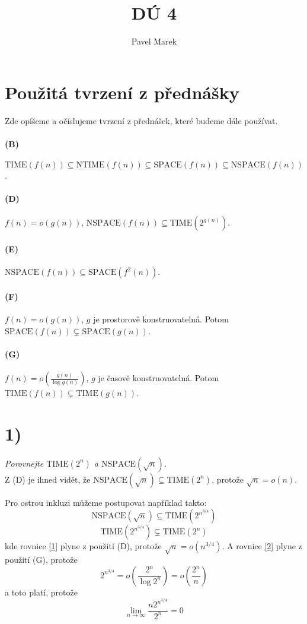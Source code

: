 \documentclass{article}
\author{Pavel Marek}
\title{DÚ 4}
\date{}
\newcommand{\TIME}[1]{\mathrm{TIME}(#1)}
\newcommand{\NTIME}[1]{\mathrm{NTIME}(#1)}
\newcommand{\SPACE}[1]{\mathrm{SPACE}(#1)}
\newcommand{\NSPACE}[1]{\mathrm{NSPACE}(#1)}
\begin{document}
\maketitle

\section*{Použitá tvrzení z přednášky}
Zde opíšeme a očíslujeme tvrzení z přednášek, které budeme dále používat.

\paragraph{(B)}
$\TIME{f(n)} \subseteq \NTIME{f(n)} \subseteq \SPACE{f(n)} \subseteq
\NSPACE{f(n)}$.

\paragraph{(D)}
$f(n) = o(g(n))$, $\NSPACE{f(n)} \subseteq \TIME{2^{g(n)}}$.

\paragraph{(E)}
$\NSPACE{f(n)} \subseteq \SPACE{f^2(n)}$.

\paragraph{(F)}
$f(n) = o(g(n))$, $g$ je prostorově konstruovatelná.
Potom $\SPACE{f(n)} \subsetneq \SPACE{g(n)}$.

\paragraph{(G)}
$f(n) = o(\frac{g(n)}{\log g(n)})$, $g$ je časově konstruovatelná.
Potom $\TIME{f(n)} \subsetneq \TIME{g(n)}$.


\section*{1)} 
\emph{Porovnejte $\TIME{2^n}$ a $\NSPACE{\sqrt{n}}$.}\\

Z (D) je ihned vidět, že $\NSPACE{\sqrt{n}} \subseteq \TIME{2^n}$,
protože $\sqrt{n} = o(n)$.

Pro ostrou inkluzi můžeme postupovat například takto: 
\begin{equation} \label{1}
  \NSPACE{\sqrt{n}} \subseteq \TIME{2^{n^{3/4}}}
\end{equation}
\begin{equation} \label{2}
  \TIME{2^{n^{3/4}}} \subsetneq \TIME{2^n}
\end{equation}
kde rovnice \ref{1} plyne z použití (D), protože $\sqrt{n} = o(n^{3/4})$.
A rovnice \ref{2} plyne z použití (G), protože
$$2^{n^{3/4}} = o(\frac{2^n}{\log 2^n}) = o(\frac{2^n}{n})$$
a toto platí, protože
$$\lim_{n \rightarrow \infty} \frac{n 2^{n^{3/4}}}{2^n} = 0$$ \\
\end{document}
